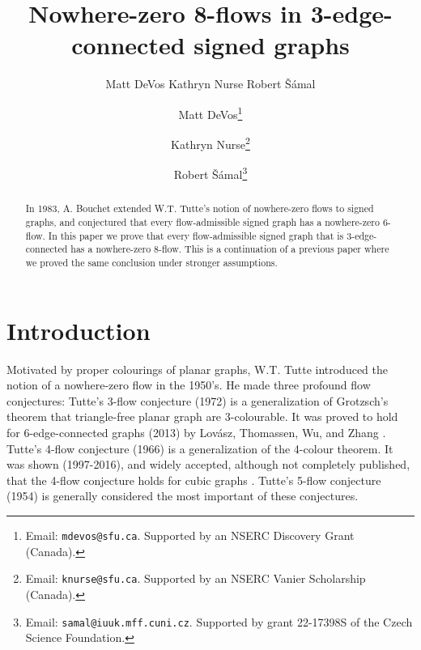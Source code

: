 \documentclass[12pt]{article}
\title{Nowhere-zero 8-flows in 3-edge-connected signed graphs}
\author{Matt DeVos \qquad Kathryn Nurse \quad Robert \v S\'amal}
\author{
   Matt DeVos\thanks{
     Email: {\tt mdevos@sfu.ca}. 
     Supported by an NSERC Discovery Grant (Canada).}
 \and
   Kathryn Nurse\thanks{
  Email: {\tt knurse@sfu.ca}.
  Supported by an NSERC Vanier Scholarship (Canada).}
  \and
    Robert \v S\'amal\thanks{
    Email: {\tt samal@iuuk.mff.cuni.cz}.     
    Supported by grant 22-17398S of the Czech Science Foundation. 
    }
}
\begin{document}
\maketitle

\begin{abstract}
    {%
    
    In 1983, A. Bouchet extended W.T. Tutte's notion of nowhere-zero flows to signed graphs, and conjectured that every flow-admissible signed graph has a nowhere-zero 6-flow. In this paper we prove that every flow-admissible signed graph that is 3-edge-connected has a nowhere-zero 8-flow. This is a continuation of a previous paper where we proved the same conclusion under stronger assumptions.}
\end{abstract}





\section{Introduction}

Motivated by proper colourings of planar graphs, W.T. Tutte introduced the notion of a nowhere-zero flow in the 1950's. He made three profound flow conjectures: Tutte's 3-flow conjecture (1972) is a generalization of Grotzsch's theorem that triangle-free planar graph are 3-colourable. It was proved to hold for 6-edge-connected graphs (2013) by Lov\'asz, Thomassen, Wu, and Zhang \cite{LTWZ}. Tutte's 4-flow conjecture (1966) is a generalization of the 4-colour theorem. It was shown (1997-2016), and widely accepted, although not completely published, that the 4-flow conjecture holds for cubic graphs \cite{RobertsonNeil1997TEC, EDWARDS201666}.     Tutte's 5-flow conjecture (1954) is generally considered the most important of these conjectures. %
\end{document}
